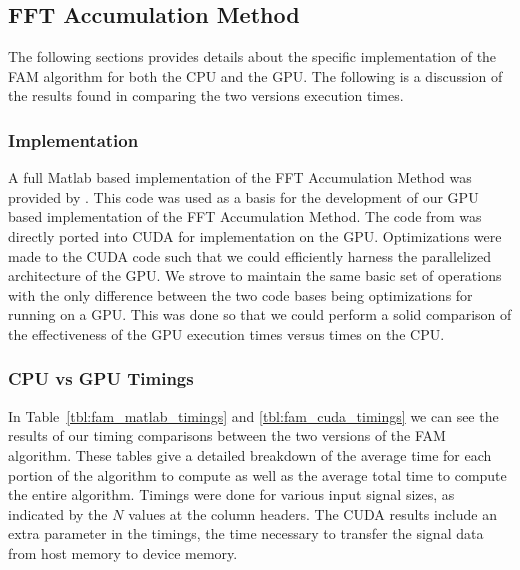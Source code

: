 \subsection{FFT Accumulation Method}
\label{sect:FAM_result}
The following sections provides details about the specific implementation of the FAM algorithm for both the CPU and the GPU.  The following is a discussion of the results found in comparing the two versions execution times.

\subsubsection{Implementation}
A full Matlab based implementation of the FFT Accumulation Method was provided by \cite{Costa96}.  This code was used as a basis for the development of our GPU based implementation of the FFT Accumulation Method.  The code from \cite{Costa96} was directly ported into CUDA for implementation on the GPU.  Optimizations were made to the CUDA code such that we could efficiently harness the parallelized architecture of the GPU.  We strove to maintain the same basic set of operations with the only difference between the two code bases being optimizations for running on a GPU.  This was done so that we could perform a solid comparison of the effectiveness of the GPU execution times versus times on the CPU.

\subsubsection{CPU vs GPU Timings}
In Table~\ref{tbl:fam_matlab_timings} and \ref{tbl:fam_cuda_timings} we can see the results of our timing comparisons between the two versions of the FAM algorithm.  These tables give a detailed breakdown of the average time for each portion of the algorithm to compute as well as the average total time to compute the entire algorithm.  Timings were done for various input signal sizes, as indicated by the $N$ values at the column headers.  The CUDA results include an extra parameter in the timings, the time necessary to transfer the signal data from host memory to device memory.


